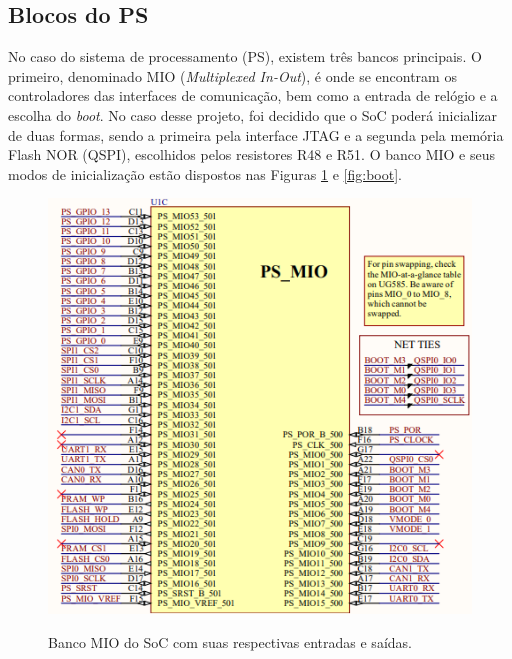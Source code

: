 \subsection{Blocos do PS}

No caso do sistema de processamento (PS), existem três bancos principais. O primeiro, denominado MIO (\textit{Multiplexed In-Out}), é onde se encontram os controladores das interfaces de comunicação, bem como a entrada de relógio e a escolha do \textit{boot}. No caso desse projeto, foi decidido que o SoC poderá inicializar de duas formas, sendo a primeira pela interface JTAG e a segunda pela memória Flash NOR (QSPI), escolhidos pelos resistores R48 e R51. O banco MIO e seus modos de inicialização estão dispostos nas Figuras \ref{fig:psmio} e \ref{fig:boot}.

\begin{figure}[H]
    \centering
    \caption{Banco MIO do SoC com suas respectivas entradas e saídas.}
    \includegraphics[scale=0.8]{images/psmio.png}
    \label{fig:psmio}
\end{figure}


